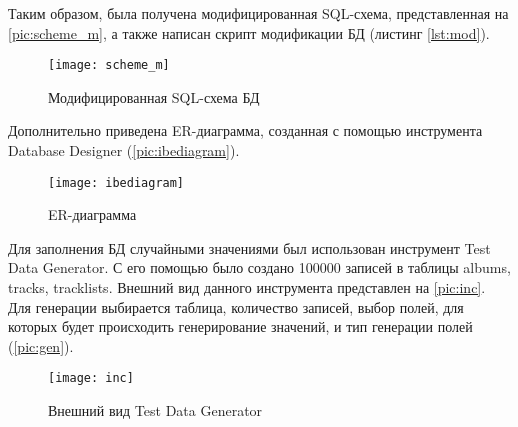 Таким образом, была получена модифицированная SQL-схема, представленная на \vref{pic:scheme_m}, а также написан скрипт модификации БД (листинг \vref{lst:mod}).

\begin{figure}[H]
	\centering
	\texttt{[image: scheme\_m]}
	\caption{Модифицированная SQL-схема БД}
	\label{pic:scheme_m}
\end{figure}



Дополнительно приведена ER-диаграмма, созданная с помощью инструмента Database Designer (\vref{pic:ibediagram}).

\begin{figure}[ht]
	\centering
	\texttt{[image: ibediagram]}
	\caption{ER-диаграмма}
	\label{pic:ibediagram}
\end{figure}

Для заполнения БД случайными значениями был использован инструмент Test Data Generator. С его помощью было создано 100000 записей в таблицы albums, tracks, tracklists. Внешний вид данного инструмента представлен на \vref{pic:inc}. Для генерации выбирается таблица, количество записей, выбор полей, для которых будет происходить генерирование значений, и тип генерации полей (\vref{pic:gen}).

\begin{figure}[ht]
	\centering
	\texttt{[image: inc]}
	\caption{Внешний вид Test Data Generator}
	\label{pic:inc}
\end{figure}

